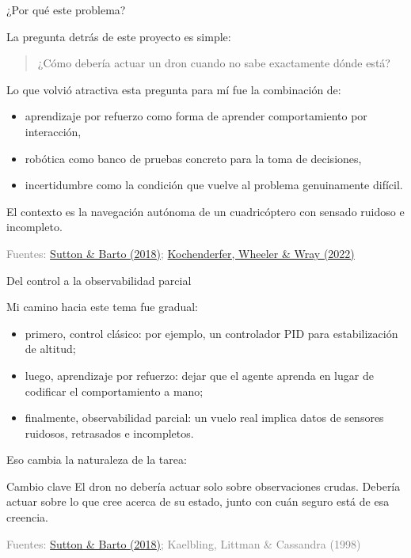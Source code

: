 \documentclass[11pt]{beamer}
\newcommand{\srcSuttonBarto}{\href{http://incompleteideas.net/book/the-book.html}{Sutton \& Barto (2018)}}
\newcommand{\srcKochenderferADM}{\href{https://algorithmsbook.com}{Kochenderfer, Wheeler \& Wray (2022)}}
\newcommand{\srcKaelbling}{Kaelbling, Littman \& Cassandra (1998)}
\newcommand{\SourceLine}[1]{\vfill{\tiny\textcolor{gray}{Fuentes: #1}}}
\begin{document}
\begin{frame}{¿Por qué este problema?}

La pregunta detrás de este proyecto es simple:

\medskip
\begin{quote}
¿Cómo debería actuar un dron cuando no sabe exactamente dónde está?
\end{quote}

\medskip
Lo que volvió atractiva esta pregunta para mí fue la combinación de:
\begin{itemize}
  \item aprendizaje por refuerzo como forma de aprender comportamiento por interacción,
  \item robótica como banco de pruebas concreto para la toma de decisiones,
  \item incertidumbre como la condición que vuelve al problema genuinamente difícil.
\end{itemize}

El contexto es la navegación autónoma de un cuadricóptero con sensado ruidoso e incompleto.

\SourceLine{\srcSuttonBarto; \srcKochenderferADM}
\end{frame}


\begin{frame}{Del control a la observabilidad parcial}

Mi camino hacia este tema fue gradual:
\begin{itemize}
  \item primero, control clásico: por ejemplo, un controlador PID para estabilización de altitud;
  \item luego, aprendizaje por refuerzo: dejar que el agente aprenda en lugar de codificar el comportamiento a mano;
  \item finalmente, observabilidad parcial: un vuelo real implica datos de sensores ruidosos, retrasados e incompletos.
\end{itemize}

\medskip
Eso cambia la naturaleza de la tarea:
\begin{block}{Cambio clave}
El dron no debería actuar solo sobre observaciones crudas. Debería actuar sobre lo que cree acerca de su estado, junto con cuán seguro está de esa creencia.
\end{block}

\SourceLine{\srcSuttonBarto; \srcKaelbling}
\end{frame}
\end{document}
